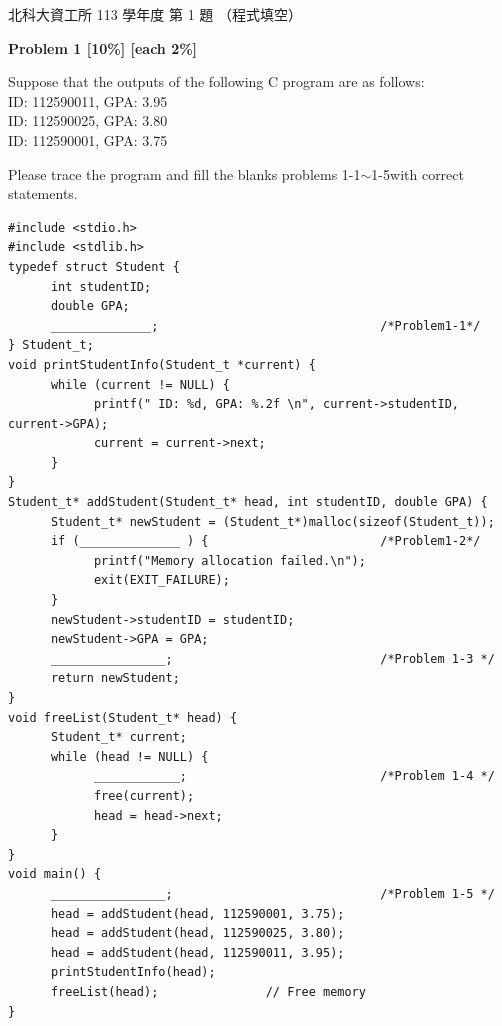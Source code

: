 \begin{pastexam}[label={px:ntut-113-prog-01}]{北科大資工所 113 學年度 第 1 題}
（程式填空）

\textbf{Problem 1 [10\%] [each 2\%]}

Suppose that the outputs of the following C program are as follows:\\
\hspace*{1em}ID: 112590011, GPA: 3.95\\
\hspace*{1em}ID: 112590025, GPA: 3.80\\
\hspace*{1em}ID: 112590001, GPA: 3.75

Please trace the program and fill the blanks problems 1-1$\sim$1-5with correct statements.
\begin{verbatim}
#include <stdio.h>
#include <stdlib.h>
typedef struct Student {
      int studentID;
      double GPA;
      ______________;                               /*Problem1-1*/
} Student_t;
void printStudentInfo(Student_t *current) {
      while (current != NULL) {
            printf(" ID: %d, GPA: %.2f \n", current->studentID, current->GPA);
            current = current->next;
      }
}
Student_t* addStudent(Student_t* head, int studentID, double GPA) {
      Student_t* newStudent = (Student_t*)malloc(sizeof(Student_t));
      if (______________ ) {                        /*Problem1-2*/
            printf("Memory allocation failed.\n");
            exit(EXIT_FAILURE);
      }
      newStudent->studentID = studentID;
      newStudent->GPA = GPA;
      ________________;                             /*Problem 1-3 */
      return newStudent;
}
void freeList(Student_t* head) {
      Student_t* current;
      while (head != NULL) {
            ____________;                           /*Problem 1-4 */
            free(current);
            head = head->next;
      }
}
void main() {
      ________________;                             /*Problem 1-5 */
      head = addStudent(head, 112590001, 3.75);
      head = addStudent(head, 112590025, 3.80);
      head = addStudent(head, 112590011, 3.95);
      printStudentInfo(head);
      freeList(head);               // Free memory
}
\end{verbatim}
\end{pastexam}

